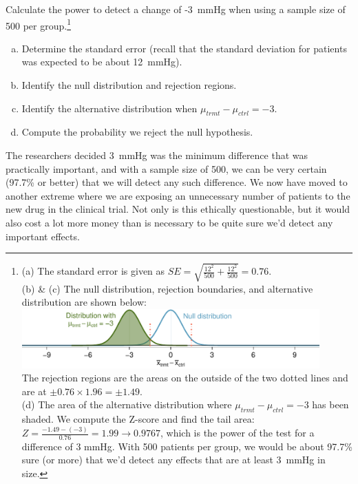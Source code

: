 \begin{exercise}
Calculate the power to detect a change of -3~mmHg when using a sample size of 500 per group.\footnote{(a) The standard error is given as $SE = \sqrt{\frac{12^2}{500} + \frac{12^2}{500}} = 0.76$.\\
(b) \& (c) The null distribution, rejection boundaries, and alternative distribution are shown below: \\
\includegraphics[width=0.9\textwidth]{ch_inference_for_means/figures/power_null_0_0-76/power_null_0_0-76_with_alt_at_3_and_shaded} \\
The rejection regions are the areas on the outside of the two dotted lines and are at $\pm 0.76 \times 1.96 = \pm 1.49$. \\
(d) The area of the alternative distribution where $\mu_{trmt} - \mu_{ctrl} = -3$ has been shaded. We compute the Z-score and find the tail area: $Z = \frac{-1.49 - (-3)}{0.76} = 1.99 \to 0.9767$, which is the power of the test for a difference of 3 mmHg. With 500 patients per group, we would be about 97.7\% sure (or more) that we'd detect any effects that are at least 3~mmHg in size.}
\begin{enumerate}[(a)]
\setlength{\itemsep}{0mm}
\item Determine the standard error (recall that the standard deviation for patients was expected to be about 12~mmHg).
\item Identify the null distribution and rejection regions.
\item Identify the alternative distribution when $\mu_{trmt} - \mu_{ctrl} = -3$.
\item Compute the probability we reject the null hypothesis.
\end{enumerate}
\end{exercise}

The researchers decided 3~mmHg was the minimum difference that was practically important, and with a sample size of 500, we can be very certain (97.7\% or better) that we will detect any such difference. We now have moved to another extreme where we are exposing an unnecessary number of patients to the new drug in the clinical trial. Not only is this ethically questionable, but it would also cost a lot more money than is necessary to be quite sure we'd detect any important effects.

